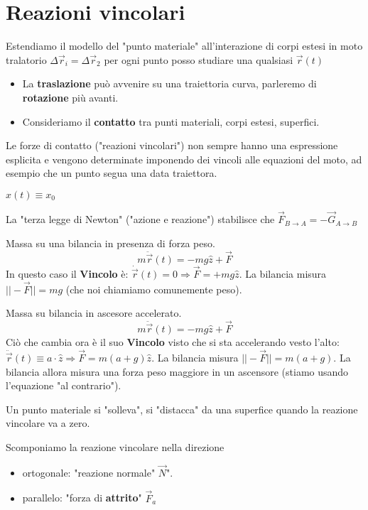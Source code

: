 \section{Reazioni vincolari}
Estendiamo il modello del "punto materiale" all'interazione di corpi estesi in moto tralatorio
$\Delta \vec{r}_i = \Delta \vec{r}_2$ per ogni punto posso studiare una qualsiasi $\vec{r}(t)$
\begin{itemize}
    \item La \textbf{traslazione} può avvenire su una traiettoria curva, parleremo di \textbf{rotazione} più avanti.
    \item Consideriamo il \textbf{contatto} tra punti materiali, corpi estesi, superfici.
\end{itemize}
Le forze di contatto ("reazioni vincolari") non sempre hanno una espressione esplicita e vengono determinate imponendo dei vincoli alle 
equazioni del moto, ad esempio che un punto segua una data traiettora.
\begin{example}
    $x(t) \equiv x_0$ %
\end{example}
\hspace{-15pt}La "terza legge di Newton" ("azione e reazione") stabilisce che $\vec{F}_{B\to A} = -\vec{G}_{A \to B}$
\begin{example}
    Massa su una bilancia in presenza di forza peso.
    $$m\ddot{\vec{r}}(t) = -mg\hat{z} + \vec{F}$$
    In questo caso il \textbf{Vincolo} è: $\dot{\vec{r}}(t) = 0 \Rightarrow \vec{F} = +mg\hat{z}$. La bilancia misura $||-\vec{F}|| = mg$ (che noi chiamiamo comunemente peso).
\end{example}
\begin{example}
    Massa su bilancia in ascesore accelerato.
    $$m\ddot{\vec{r}}(t) = -mg\hat{z} + \vec{F}$$
    Ciò che cambia ora è il suo \textbf{Vincolo} visto che si sta accelerando vesto l'alto: $\ddot{\vec{r}}(t) \equiv a \cdot \hat{z} \Rightarrow \vec{F}= m(a+g)\hat{z}$. La bilancia misura $||-\vec{F}|| = m(a+g)$.
    La bilancia allora misura una forza peso maggiore in un ascensore (stiamo usando l'equazione "al contrario").
\end{example}
\begin{note}
    Un punto materiale si "solleva", si "distacca" da una superfice quando la reazione vincolare va a zero.
\end{note}
\hspace{-15pt}Scomponiamo la reazione vincolare nella direzione
\begin{itemize}
    \item ortogonale: "reazione normale" $\vec{N}$".
    \item parallelo: "forza di \textbf{attrito}" $\vec{F}_a$
\end{itemize}
